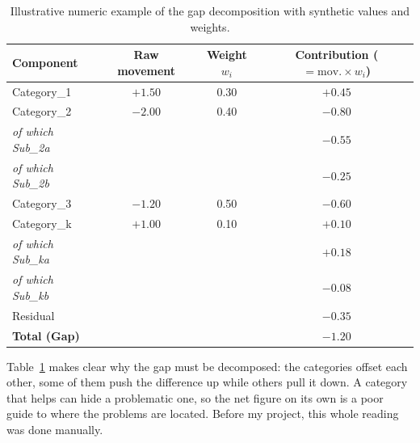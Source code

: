 \documentclass[12pt,a4paper,openright,twoside]{book}
\begin{document}
  \begin{table}[ht]
    \centering
    \renewcommand{\arraystretch}{1.3}
    \begin{tabular}{lccc}
    \toprule
    \textbf{Component} & \textbf{Raw movement} & \textbf{Weight} $w_i$ & \textbf{Contribution} ($= \text{mov.} \times w_i$) \\
    \midrule
    Category\_1   & $+1.50$ & 0.30 & $+0.45$ \\
    Category\_2   & $-2.00$ & 0.40 & $-0.80$ \\
    \quad\quad \textit{of which Sub\_2a} &  &  & $-0.55$ \\
    \quad\quad \textit{of which Sub\_2b} &  &  & $-0.25$ \\
    Category\_3   & $-1.20$ & 0.50 & $-0.60$ \\
    Category\_k   & $+1.00$ & 0.10 & $+0.10$ \\
    \quad\quad \textit{of which Sub\_ka} &  &  & $+0.18$ \\
    \quad\quad \textit{of which Sub\_kb} &  &  & $-0.08$ \\
    Residual      &         &      & $-0.35$ \\
    \midrule
    \textbf{Total (Gap)} & & & $\mathbf{-1.20}$ \\
    \bottomrule
    \end{tabular}
    \caption{Illustrative numeric example of the gap decomposition with synthetic values and weights.}
    \label{tab:ch3_decomposition}
    \end{table}

Table~\ref{tab:ch3_decomposition} makes clear why the gap must be decomposed: the categories offset each other, some of them push the difference up while others pull it down.
A category that helps can hide a problematic one, so the net figure on its own is a poor guide to where the problems are located. Before my project, this whole reading was done manually.
  
\end{document}
